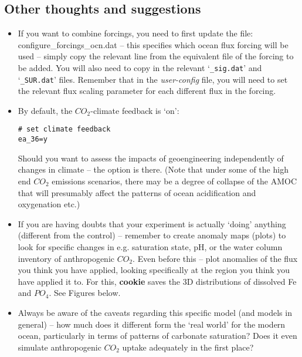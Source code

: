 \subsection{Other thoughts and suggestions}

\begin{itemize}

\vspace{1mm}
\item If you want to combine forcings, you need to first update the file: \textsf{\footnotesize configure\_forcings\_ocn.dat} – this specifies which ocean flux forcing will be used – simply copy the relevant line from the equivalent file of the forcing to be added. You will also need to copy in the relevant ‘\texttt{\_sig.dat}’ and ‘\texttt{\_SUR.dat}’ files. Remember that in the \textit{user-config} file, you will need to set the relevant flux scaling parameter for each different flux in the forcing.

\vspace{1mm}
\item By default, the \(CO_{2}\)-climate feedback is ‘on’:
\vspace{-2pt}\small\begin{verbatim}
# set climate feedback
ea_36=y
\end{verbatim}\normalsize\vspace{-2pt}
Should you want to assess the impacts of geoengineering independently of changes in climate -- the option is there. (Note that under some of the high end \(CO_{2}\) emissions scenarios, there may be a degree of collapse of the AMOC that will presumably affect the patterns of ocean acidification and oxygenation etc.)

\vspace{1mm}
\item If you are having doubts that your experiment is actually ‘doing’ anything (different from the control) – remember to create anomaly maps (plots) to look for specific changes in e.g. saturation state, pH, or the water column inventory of anthropogenic \(CO_{2}\). Even before this – plot anomalies of the flux you think you have applied, looking specifically at the region you think you have applied it to. For this, \textbf{cookie} saves the 3D distributions of dissolved Fe and \(PO_{4}\). See Figures below.

\vspace{1mm}
\item Always be aware of the caveats regarding this specific model (and models in general) – how much does it different form the ‘real world’ for the modern ocean, particularly in terms of patterns of carbonate saturation? Does it even simulate anthropogenic \(CO_{2}\) uptake adequately in the first place?

\end{itemize}

